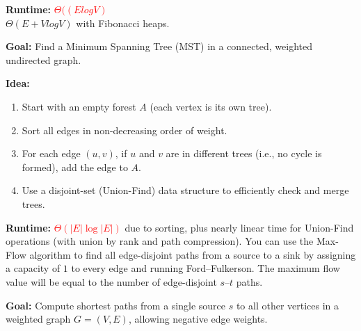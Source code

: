 \documentclass[a4paper,landscape]{article}
\newcommand{\timecomplexity}[1]{\textcolor{red}{#1}}
\begin{document}
\begin{multicols}{7}
\textbf{Runtime:} \timecomplexity{$\Theta((ElogV)$} \\ $\Theta(E+VlogV)$ with Fibonacci heaps.
\endtcolorbox

\tcolorbox[mybox={Kruskal’s Algorithm}]
\textbf{Goal:} Find a Minimum Spanning Tree (MST) in a connected, weighted undirected graph.

\textbf{Idea:}
\begin{enumerate}[noitemsep, topsep=0pt]
    \item Start with an empty forest $A$ (each vertex is its own tree).
    \item Sort all edges in non-decreasing order of weight.
    \item For each edge $(u, v)$, if $u$ and $v$ are in different trees (i.e., no cycle is formed), add the edge to $A$.
    \item Use a disjoint-set (Union-Find) data structure to efficiently check and merge trees.
\end{enumerate}

\noindent %

\textbf{Runtime:} \timecomplexity{$\Theta(|E| \log |E|)$} due to sorting, plus nearly linear time for Union-Find operations (with union by rank and path compression).
\endtcolorbox
\tcolorbox[mybox={Edge Disjoint Paths using Max Flow}]
You can use the Max-Flow algorithm to find all edge-disjoint paths from a source to a sink by assigning a capacity of $1$ to every edge and running Ford–Fulkerson.  
The maximum flow value will be equal to the number of edge-disjoint $s$–$t$ paths.
\endtcolorbox


\tcolorbox[mybox={Bellman-Ford Algorithm}]
\textbf{Goal:} Compute shortest paths from a single source $s$ to all other vertices in a weighted graph $G = (V, E)$, allowing negative edge weights.


\end{multicols}
\end{document}
